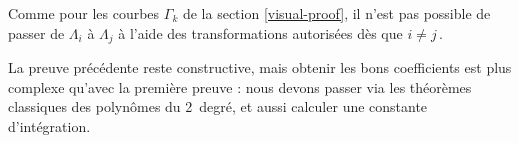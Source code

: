 

\medskip

Comme pour les courbes $\Gamma_k$ de la section \ref{visual-proof}, il n'est pas possible de passer de $\Lambda_i$  à $\Lambda_j$ à l'aide des transformations autorisées dès que $i \neq j$\,.




\begin{remark}
	La preuve précédente reste constructive, mais obtenir les bons coefficients est plus complexe qu'avec la première preuve : nous devons passer via les théorèmes classiques des polynômes du 2\ieme\ degré, et aussi calculer une constante d'intégration.
\end{remark}